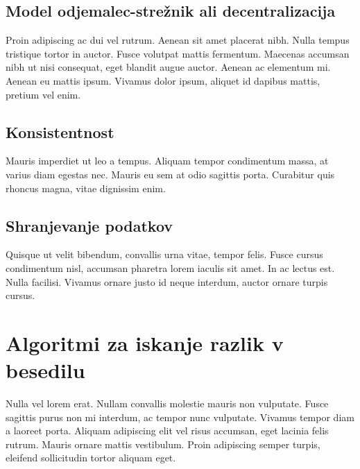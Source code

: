 \documentclass[a4paper, 12pt, twoside]{book}
\begin{document}
\section{Model odjemalec-strežnik ali decentralizacija}

Proin adipiscing ac dui vel rutrum. Aenean sit amet placerat nibh. Nulla tempus tristique tortor in auctor. Fusce volutpat mattis fermentum. Maecenas accumsan nibh ut nisi consequat, eget blandit augue auctor. Aenean ac elementum mi. Aenean eu mattis ipsum. Vivamus dolor ipsum, aliquet id dapibus mattis, pretium vel enim.

\section{Konsistentnost}

Mauris imperdiet ut leo a tempus. Aliquam tempor condimentum massa, at varius diam egestas nec. Mauris eu sem at odio sagittis porta. Curabitur quis rhoncus magna, vitae dignissim enim.

\section{Shranjevanje podatkov}

Quisque ut velit bibendum, convallis urna vitae, tempor felis. Fusce cursus condimentum nisl, accumsan pharetra lorem iaculis sit amet. In ac lectus est. Nulla facilisi. Vivamus ornare justo id neque interdum, auctor ornare turpis cursus.

\chapter{Algoritmi za iskanje razlik v besedilu}

Nulla vel lorem erat. Nullam convallis molestie mauris non vulputate. Fusce sagittis purus non mi interdum, ac tempor nunc vulputate. Vivamus tempor diam a laoreet porta. Aliquam adipiscing elit vel risus accumsan, eget lacinia felis rutrum. Mauris ornare mattis vestibulum. Proin adipiscing semper turpis, eleifend sollicitudin tortor aliquam eget.

\end{document}
